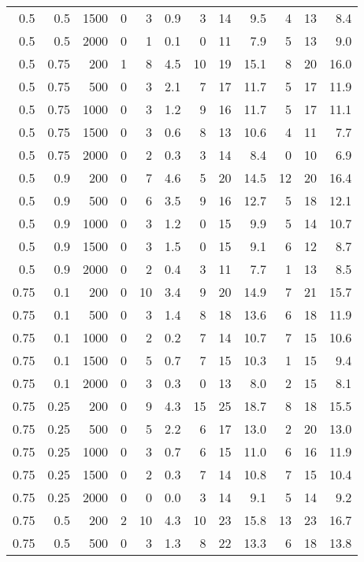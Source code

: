 \documentclass[a4paper, 12pt]{extreport}
\begin{document}
\begin{longtable}{|r|r|r|r|r|r|r|r|r|r|r|r|}
0.5 & 0.5 & 1500 & 0 & 3 & 0.9 & 3 & 14 & 9.5 & 4 & 13 & 8.4 \\ 
0.5 & 0.5 & 2000 & 0 & 1 & 0.1 & 0 & 11 & 7.9 & 5 & 13 & 9.0 \\ 
\hline
0.5 & 0.75 & 200 & 1 & 8 & 4.5 & 10 & 19 & 15.1 & 8 & 20 & 16.0 \\ 
0.5 & 0.75 & 500 & 0 & 3 & 2.1 & 7 & 17 & 11.7 & 5 & 17 & 11.9 \\ 
0.5 & 0.75 & 1000 & 0 & 3 & 1.2 & 9 & 16 & 11.7 & 5 & 17 & 11.1 \\ 
0.5 & 0.75 & 1500 & 0 & 3 & 0.6 & 8 & 13 & 10.6 & 4 & 11 & 7.7 \\ 
0.5 & 0.75 & 2000 & 0 & 2 & 0.3 & 3 & 14 & 8.4 & 0 & 10 & 6.9 \\ 
\hline
0.5 & 0.9 & 200 & 0 & 7 & 4.6 & 5 & 20 & 14.5 & 12 & 20 & 16.4 \\ 
0.5 & 0.9 & 500 & 0 & 6 & 3.5 & 9 & 16 & 12.7 & 5 & 18 & 12.1 \\ 
0.5 & 0.9 & 1000 & 0 & 3 & 1.2 & 0 & 15 & 9.9 & 5 & 14 & 10.7 \\ 
0.5 & 0.9 & 1500 & 0 & 3 & 1.5 & 0 & 15 & 9.1 & 6 & 12 & 8.7 \\ 
0.5 & 0.9 & 2000 & 0 & 2 & 0.4 & 3 & 11 & 7.7 & 1 & 13 & 8.5 \\ 
\hline
0.75 & 0.1 & 200 & 0 & 10 & 3.4 & 9 & 20 & 14.9 & 7 & 21 & 15.7 \\ 
0.75 & 0.1 & 500 & 0 & 3 & 1.4 & 8 & 18 & 13.6 & 6 & 18 & 11.9 \\ 
0.75 & 0.1 & 1000 & 0 & 2 & 0.2 & 7 & 14 & 10.7 & 7 & 15 & 10.6 \\ 
0.75 & 0.1 & 1500 & 0 & 5 & 0.7 & 7 & 15 & 10.3 & 1 & 15 & 9.4 \\ 
0.75 & 0.1 & 2000 & 0 & 3 & 0.3 & 0 & 13 & 8.0 & 2 & 15 & 8.1 \\ 
\hline
0.75 & 0.25 & 200 & 0 & 9 & 4.3 & 15 & 25 & 18.7 & 8 & 18 & 15.5 \\ 
0.75 & 0.25 & 500 & 0 & 5 & 2.2 & 6 & 17 & 13.0 & 2 & 20 & 13.0 \\ 
0.75 & 0.25 & 1000 & 0 & 3 & 0.7 & 6 & 15 & 11.0 & 6 & 16 & 11.9 \\ 
0.75 & 0.25 & 1500 & 0 & 2 & 0.3 & 7 & 14 & 10.8 & 7 & 15 & 10.4 \\ 
0.75 & 0.25 & 2000 & 0 & 0 & 0.0 & 3 & 14 & 9.1 & 5 & 14 & 9.2 \\ 
\hline
0.75 & 0.5 & 200 & 2 & 10 & 4.3 & 10 & 23 & 15.8 & 13 & 23 & 16.7 \\ 
0.75 & 0.5 & 500 & 0 & 3 & 1.3 & 8 & 22 & 13.3 & 6 & 18 & 13.8 \\ 

\end{longtable}
\end{document}
